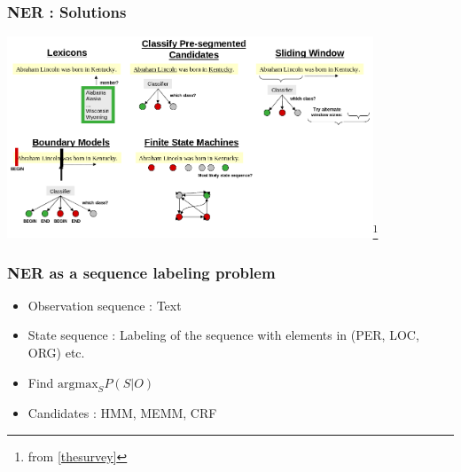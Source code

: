 \begin{frame}
 \frametitle{NER : Solutions}
 \begin{center}
 \includegraphics[height = 6cm]{cohen}\footnote{from \ref{thesurvey}}
 \end{center}

\end{frame}

 \begin{frame}
 \frametitle{NER as a sequence labeling problem}
 \begin{itemize}
  \item Observation sequence : Text \medskip
  \item State sequence : Labeling of the sequence with elements in (PER, LOC, ORG) etc. \medskip
  \item Find $\text{argmax}_{S}  P(S|O)$ \medskip
  \item Candidates : HMM, MEMM, CRF
  \end{itemize}
\end{frame}

